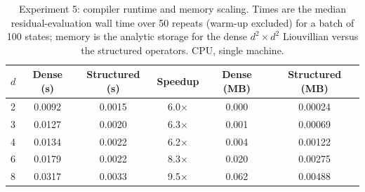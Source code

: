 \begin{table}[ht]
\centering
\caption{Experiment 5: compiler runtime and memory scaling. Times are the median residual-evaluation wall time over 50 repeats (warm-up excluded) for a batch of 100 states; memory is the analytic storage for the dense $d^2\times d^2$ Liouvillian versus the structured operators. CPU, single machine.}
\label{tab:exp5}
\begin{tabular}{lccccc}
\toprule
$d$ & Dense (s) & Structured (s) & Speedup & Dense (MB) & Structured (MB) \\
\midrule
2 & 0.0092 & 0.0015 & 6.0$\times$ & 0.000 & 0.00024 \\
3 & 0.0127 & 0.0020 & 6.3$\times$ & 0.001 & 0.00069 \\
4 & 0.0134 & 0.0022 & 6.2$\times$ & 0.004 & 0.00122 \\
6 & 0.0179 & 0.0022 & 8.3$\times$ & 0.020 & 0.00275 \\
8 & 0.0317 & 0.0033 & 9.5$\times$ & 0.062 & 0.00488 \\
\bottomrule
\end{tabular}
\end{table}
